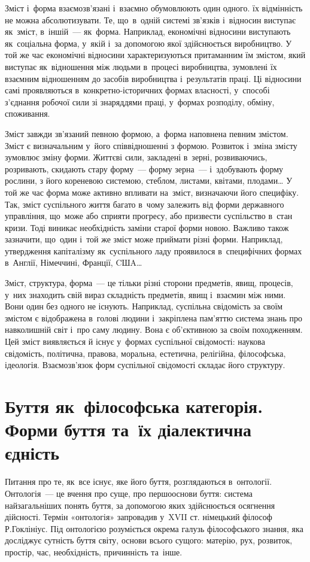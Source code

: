 \documentclass[a5paper,oneside,DIV=12,12pt,headings=small]{scrartcl}
\begin{document}
		Зміст і~форма взаємозв'язані і~взаємно обумовлюють один одного. їх відмінність не можна абсолютизувати. Те, що~в~одній системі зв'язків і~відносин виступає як~зміст, в~іншій~— як~форма. Наприклад, економічні відносини виступають як~соціальна форма, у~якій і~за допомогою якої здійснюється виробництво. У той же час економічні відносини характеризуються притаманним їм змістом, який виступає як~відношення між людьми в~процесі виробництва, зумовлені їх взаємним відношенням до засобів виробництва і~результатів праці. Ці відносини самі проявляються в~конкретно-історичних формах власності, у~способі з'єднання робочої сили зі знаряддями праці, у~формах розподілу, обміну, споживання.
		
		Зміст завжди зв'язаний певною формою, а~форма наповнена певним змістом. Зміст є визначальним у~його співвідношенні з формою. Розвиток і~зміна змісту зумовлює зміну форми. Життєві сили, закладені в~зерні, розвиваючись, розривають, скидають стару форму~— форму зерна~— і~здобувають форму рослини, з його кореневою системою, стеблом, листами, квітами, плодами… У той же час форма може активно впливати на~зміст, визначаючи його специфіку. Так, зміст суспільного життя багато в~чому залежить від форми державного управління, що~може або сприяти прогресу, або призвести суспільство в~стан кризи. Тоді виникає необхідність заміни старої форми новою. Важливо також зазначити, що~один і~той же зміст може приймати різні форми. Наприклад, утвердження капіталізму як~суспільного ладу проявилося в~специфічних формах в~Англії, Німеччині, Франції, CШA…
		
		Зміст, структура, форма~— це тільки різні сторони предметів, явищ, процесів, у~них знаходить свій вираз складність предметів, явищ і~взаємин між ними. Вони один без одного не існують. Наприклад, суспільна свідомість за своїм змістом є відображена в~голові людини і~закріплена пам'яттю система знань про навколишній світ і~про саму людину. Вона є об'єктивною за своїм походженням. Цей зміст виявляється й існує у~формах суспільної свідомості: наукова свідомість, політична, правова, моральна, естетична, релігійна, філософська, ідеологія. Взаємозв'язок форм суспільної свідомості складає його структуру.
		
	\section{Буття як~філософська категорія. Форми буття та~їх діалектична єдність}
		
		Питання про те, як~все існує, яке його буття, розглядаються в~онтології. Онтологія~— це вчення про суще, про першооснови буття: система найзагальніших понять буття, за допомогою яких здійснюється осягнення дійсності. Термін «онтологія» запровадив у~XVII ст. німецький філософ Р.Гоклініус. Під онтологією розуміється окрема галузь філософського знання, яка досліджує сутність буття світу, основи всього сущого: матерію, рух, розвиток, простір, час, необхідність, причинність та~інше.
		
\end{document}
